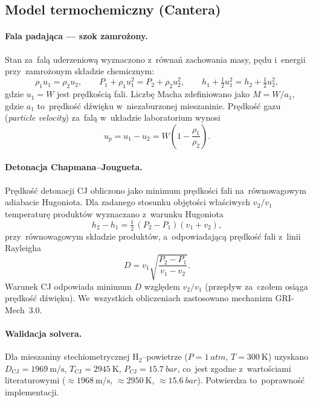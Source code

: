 \documentclass[11pt,a4paper]{article}
\begin{document}
\subsection{Model termochemiczny (Cantera)}
\paragraph{Fala padająca --- szok zamrożony.}
Stan za~falą uderzeniową wyznaczono z~równań zachowania masy, pędu i~energii
przy~zamrożonym składzie chemicznym:
\begin{equation}
\rho_1 u_1=\rho_2 u_2,\qquad
P_1+\rho_1 u_1^2=P_2+\rho_2 u_2^2,\qquad
h_1+\tfrac12 u_1^2=h_2+\tfrac12 u_2^2,
\end{equation}
gdzie $u_1=W$ jest prędkością fali. Liczbę Macha zdefiniowano jako
$M=W/a_1$, gdzie $a_1$ to~prędkość dźwięku w~niezaburzonej mieszaninie.
Prędkość gazu (\emph{particle velocity}) za~falą w~układzie laboratorium wynosi
\begin{equation}
u_p=u_1-u_2=W\!\left(1-\frac{\rho_1}{\rho_2}\right).
\label{eq:up}
\end{equation}

\paragraph{Detonacja Chapmana--Jougueta.}
Prędkość detonacji CJ obliczono jako minimum prędkości fali na~równowagowym
adiabacie Hugoniota. Dla zadanego stosunku objętości właściwych $v_2/v_1$
temperaturę produktów wyznaczano z~warunku Hugoniota
\begin{equation}
h_2-h_1=\tfrac12\,(P_2-P_1)(v_1+v_2),
\end{equation}
przy~równowagowym składzie produktów, a~odpowiadającą prędkość fali z~linii
Rayleigha
\begin{equation}
D=v_1\sqrt{\frac{P_2-P_1}{v_1-v_2}}.
\end{equation}
Warunek CJ odpowiada minimum $D$ względem $v_2/v_1$ (przepływ za~czołem osiąga
prędkość dźwięku). We~wszystkich obliczeniach zastosowano mechanizm
GRI-Mech~3.0.

\paragraph{Walidacja solvera.}
Dla mieszaniny stechiometrycznej $\mathrm{H_2}$--powietrze
($P=\SI{1}{atm}$, $T=\SI{300}{\kelvin}$) uzyskano
$D_{\mathrm{CJ}}=\SI{1969}{\meter\per\second}$,
$T_{\mathrm{CJ}}=\SI{2945}{\kelvin}$, $P_{\mathrm{CJ}}=\SI{15,7}{bar}$,
co~jest zgodne z~wartościami literaturowymi
($\approx\SI{1968}{\meter\per\second}$, $\approx\SI{2950}{\kelvin}$,
$\approx\SI{15,6}{bar}$). Potwierdza to~poprawność implementacji.
\end{document}
